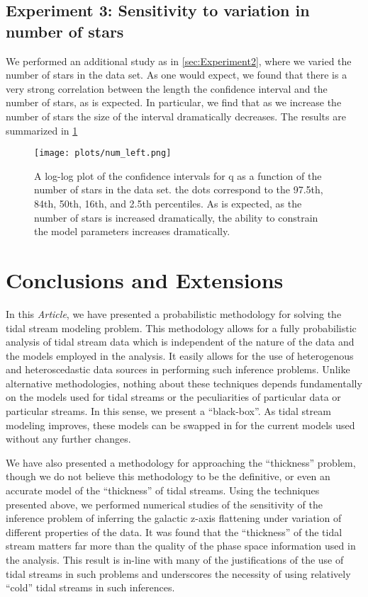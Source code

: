 \documentclass[12pt,preprint]{aastex}
\theoremstyle{plain}
\theoremstyle{definition}
\newcommand{\documentname}{\textsl{Article}}
\begin{document}
\subsection{\label{sec:Experiment3} Experiment 3: Sensitivity to variation in number of stars}
We performed an additional study as in \ref{sec:Experiment2}, where we varied the number of stars in the data set. As one would expect, we found that there is a very strong correlation between the length the confidence interval and the number of stars, as is expected. In particular, we find that as we increase the number of stars the size of the interval dramatically decreases. The results are summarized in \figurename \ref{fig:num_left}
\begin{figure}[ht]
\begin{center}
\texttt{[image: plots/num\_left.png]}
\caption{A log-log plot of the confidence intervals for q as a function of the number of stars in the data set. the dots correspond to the 97.5th, 84th, 50th, 16th, and 2.5th percentiles. As is expected, as the number of stars is increased dramatically, the ability to constrain the model parameters increases dramatically. }
\label{fig:num_left}
\end{center}
\end{figure}

\section{Conclusions and Extensions}

In this \documentname, we have presented a probabilistic methodology for solving the tidal stream modeling problem. This methodology allows for a fully probabilistic analysis of tidal stream data which is independent of the nature of the data and the models employed in the analysis. It easily allows for the use of heterogenous and heteroscedastic data sources in performing such inference problems. Unlike alternative methodologies, nothing about these techniques depends fundamentally on the models used for tidal streams or the peculiarities of particular data or particular streams. In this sense, we present a ``black-box''. As tidal stream modeling improves, these  models can be swapped in for the current models used without any further changes. 

We have also presented a methodology for approaching the ``thickness'' problem, though we do not believe this methodology to be the definitive, or even an accurate model of the ``thickness'' of tidal streams. Using the techniques presented above, we performed numerical studies of the sensitivity of the inference problem of inferring the galactic z-axis flattening under variation of different properties of the data. It was found that the ``thickness'' of the tidal stream matters far more than the quality of the phase space information used in the analysis. This result is in-line with many of the justifications of the use of tidal streams in such problems and underscores the necessity of using relatively ``cold'' tidal streams in such inferences.
\end{document}
